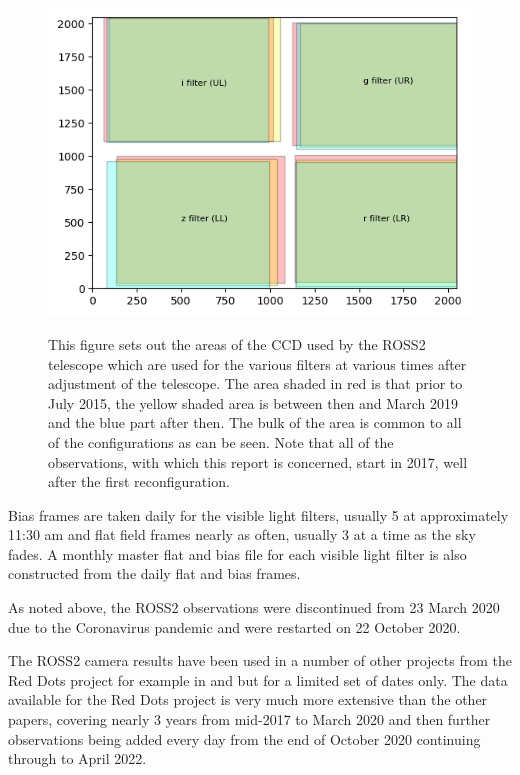 \begin{figure}[!htbp]
\begin{center}
\includegraphics[scale=1]{images/showusedccd.png} \\
\end{center}   
\caption{This figure sets out the areas of the CCD used by the ROSS2
telescope which are used for the various filters at various times after
adjustment of the telescope. The area shaded in red is that prior to July 2015, the yellow shaded area is between
then and March 2019 and the blue part after then. The bulk of the area is
common to all of the configurations as can be seen. Note that all of the
{\rdwarf} observations, with which this report is concerned, start in 2017, well
after the first reconfiguration.} \protect\label{fig:showusedccd}
\end{figure}

Bias frames are taken daily for the visible light filters, usually 5 at
approximately 11:30 am and flat field frames nearly as often, usually 3 at a
time as the sky fades. A monthly master flat and bias file for each visible
light filter is also constructed from the daily flat and bias frames.

As noted above, the ROSS2 observations were discontinued from 23 March 2020 due
to the Coronavirus pandemic and were restarted on 22 October 2020.

The ROSS2 camera results have been used in a number of other projects from the
Red Dots project for example in \citet{frasca20} and \citet{riverasandoval18}
but for a limited set of dates only. The data available for the Red Dots project
is very much more extensive than the other papers, covering nearly 3 years from mid-2017 to March 2020 and then
further observations being added every day from the end of October 2020
continuing through to April 2022.

